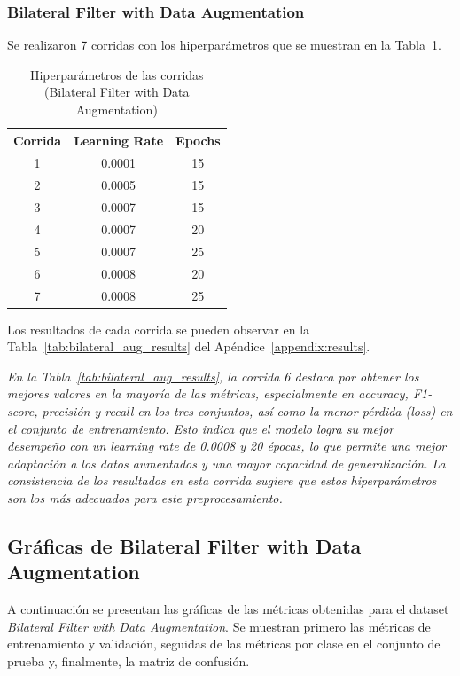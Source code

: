 \documentclass[conference]{IEEEtran}
\begin{document}
\subsubsection{Bilateral Filter with Data Augmentation}
Se realizaron 7 corridas con los hiperparámetros que se muestran en la Tabla~\ref{tab:bilateral_aug_hparams}.

\begin{table}[H]
\caption{Hiperparámetros de las corridas (Bilateral Filter with Data Augmentation)}
\centering
\begin{tabular}{|c|c|c|}
\hline
\textbf{Corrida} & \textbf{Learning Rate} & \textbf{Epochs} \\
\hline
1 & 0.0001 & 15 \\
2 & 0.0005 & 15 \\
3 & 0.0007 & 15 \\
4 & 0.0007 & 20 \\
5 & 0.0007 & 25 \\
6 & 0.0008 & 20 \\
7 & 0.0008 & 25 \\
\hline
\end{tabular}
\label{tab:bilateral_aug_hparams}
\end{table}

Los resultados de cada corrida se pueden observar en la Tabla~\ref{tab:bilateral_aug_results} del Apéndice~\ref{appendix:results}.

\noindent\textit{
En la Tabla~\ref{tab:bilateral_aug_results}, la corrida 6 destaca por obtener los mejores valores en la mayoría de las métricas, especialmente en accuracy, F1-score, precisión y recall en los tres conjuntos, así como la menor pérdida (loss) en el conjunto de entrenamiento. Esto indica que el modelo logra su mejor desempeño con un learning rate de 0.0008 y 20 épocas, lo que permite una mejor adaptación a los datos aumentados y una mayor capacidad de generalización. La consistencia de los resultados en esta corrida sugiere que estos hiperparámetros son los más adecuados para este preprocesamiento.
}

\subsection{Gráficas de Bilateral Filter with Data Augmentation}

A continuación se presentan las gráficas de las métricas obtenidas para el dataset \textit{Bilateral Filter with Data Augmentation}. Se muestran primero las métricas de entrenamiento y validación, seguidas de las métricas por clase en el conjunto de prueba y, finalmente, la matriz de confusión.
\end{document}
